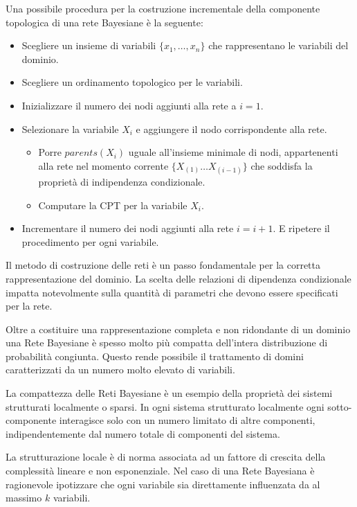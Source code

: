Una possibile procedura per la costruzione incrementale della componente topologica
di una rete Bayesiane è la seguente:
\begin{itemize}
    \item Scegliere un insieme di variabili $\{x_1, \dots, x_n\}$ che rappresentano
          le variabili del dominio.
    \item Scegliere un ordinamento topologico per le variabili.
    \item Inizializzare il numero dei nodi aggiunti alla rete a $i = 1$.
    \item Selezionare la variabile $X_i$ e aggiungere il nodo corrispondente alla
          rete.
          \begin{itemize}
              \item Porre $parents(X_i)$ uguale all'insieme minimale di nodi,
                    appartenenti alla rete nel momento corrente $\{X_{(1)} \dots X_{(i-1)}\}$
                    che soddisfa la proprietà di indipendenza condizionale.
              \item Computare la CPT per la variabile $X_i$.
          \end{itemize}
    \item Incrementare il numero dei nodi aggiunti alla rete $i=i+1$. E ripetere il
          procedimento per ogni variabile.
\end{itemize}
Il metodo di costruzione delle reti è un passo fondamentale per la corretta
rappresentazione del dominio. La scelta delle relazioni di dipendenza condizionale
impatta notevolmente sulla quantità di parametri che devono essere specificati
per la rete.

Oltre a costituire una rappresentazione completa e non ridondante di un dominio
una Rete Bayesiane è spesso molto più compatta dell'intera distribuzione di
probabilità congiunta. Questo rende possibile il trattamento di domini
caratterizzati da un numero molto elevato di variabili.

La compattezza delle Reti Bayesiane è un esempio della proprietà dei sistemi
strutturati localmente o sparsi. In ogni sistema strutturato localmente ogni
sotto-componente interagisce solo con un numero limitato di altre componenti,
indipendentemente dal numero totale di componenti del sistema.

La strutturazione locale è di norma associata ad un fattore di crescita della
complessità lineare e non esponenziale. Nel caso di una Rete Bayesiana è
ragionevole ipotizzare che ogni variabile sia direttamente influenzata da al
massimo $k$ variabili.

